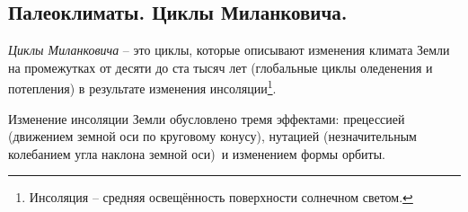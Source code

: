 \subsection{Палеоклиматы. Циклы Миланковича.}
\textit{Циклы Миланковича} -- это циклы, которые описывают изменения климата Земли на промежутках от десяти до ста тысяч лет (глобальные циклы оледенения и потепления) в результате изменения инсоляции\footnote{Инсоляция -- средняя освещённость поверхности солнечном светом.}.

Изменение инсоляции Земли обусловлено тремя эффектами: прецессией (движением земной оси по круговому конусу), нутацией (незначительным колебанием угла наклона земной оси) и изменением формы орбиты.
